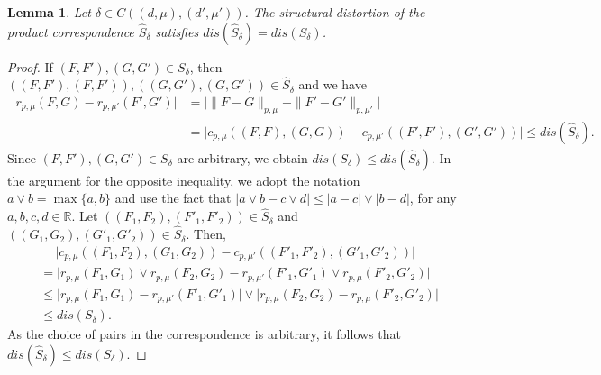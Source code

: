 \documentclass[11pt]{article}
\newtheorem{lemma}[theorem]{Lemma}
\theoremstyle{definition}
\newcommand{\real}{\ensuremath{\mathbb{R}}}
\newcommand{\dlp}[1]{\ensuremath{r_{p,#1}}}
\newcommand{\dlpc}[1]{\ensuremath{c_{p,#1}}}
\begin{document}
\begin{lemma} \label{L:proddis}
Let $\delta \in C((d,\mu),(d',\mu'))$. The structural distortion of the product correspondence $\hat{S}_\delta$ satisfies $dis(\hat{S}_\delta) = dis (S_\delta)$.
\end{lemma}

\begin{proof}
If $(F,F'), (G,G') \in S_\delta$, then $((F,F'),(F,F')), ((G,G'),(G,G')) \in \hat{S}_\delta$ and we have
\begin{equation}
\begin{split}
\big|\dlp{\mu} (F,G) - \dlp{\mu'} (F',G')\big| 
&= \big|\|F-G\|_{p,\mu} - \|F'-G'\|_{p,\mu'}\big| \\
&= \big|\dlpc{\mu} ((F,F),(G,G)) - \dlpc{\mu'} ((F',F'),(G',G'))\big|
\leq dis(\hat{S}_\delta).
\end{split}
\end{equation}
Since $(F,F'), (G,G') \in S_\delta$ are arbitrary, we obtain $dis(S_\delta) \leq dis(\hat{S}_\delta)$. In the argument for the opposite inequality, we adopt the notation $a \vee b = \max \{a,b\}$ and use the fact that $|a\vee b - c\vee d| \leq |a-c| \vee |b-d|$, for any $a,b,c,d \in \real$. Let $((F_1,F_2),(F'_1,F'_2)) \in \hat{S}_\delta$ and $((G_1,G_2),(G'_1,G'_2)) \in \hat{S}_\delta$. Then,
\begin{equation}
\begin{split}
&\quad \ \big|\dlpc{\mu} ((F_1,F_2),(G_1,G_2)) - \dlpc{\mu'} ((F'_1,F'_2),(G'_1,G'_2))\big| \\
&= \big|\dlp{\mu} (F_1,G_1) \vee \dlp{\mu} (F_2,G_2) - 
\dlp{\mu'} (F'_1,G'_1) \vee \dlp{\mu} (F'_2,G'_2) \big| \\
&\leq \big|\dlp{\mu} (F_1,G_1) - \dlp{\mu'} (F'_1,G'_1)\big| \vee
\big|\dlp{\mu} (F_2,G_2) - \dlp{\mu} (F'_2,G'_2) \big| \\
&\leq dis(S_\delta).
\end{split}
\end{equation}
As the choice of pairs in the correspondence is arbitrary, it follows that $dis(\hat{S}_\delta) \leq dis(S_\delta)$.
\end{proof}
\end{document}
